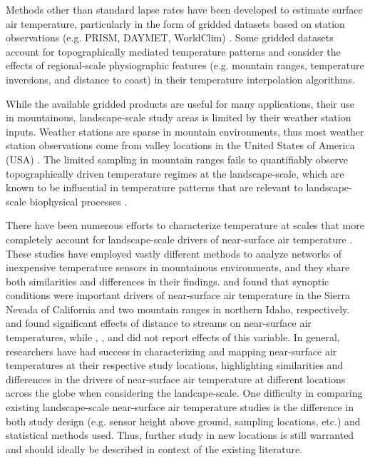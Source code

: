 \documentclass{ametsoc}
\begin{document}
Methods other than standard lapse rates have been developed to estimate surface
air temperature,  particularly in the form of gridded datasets based on station
observations  (e.g. PRISM, DAYMET, WorldClim)
\citep{Daly2008,Thornton1997,Hijmans2005}.   Some gridded datasets account for
topographically  mediated temperature patterns and consider the effects of
regional-scale  physiographic features (e.g. mountain ranges, temperature
inversions, and  distance to coast) in their temperature interpolation
algorithms.

While the available gridded products are useful for many applications, 
their use in mountainous, landscape-scale study areas is limited by their 
weather station inputs.  Weather stations are sparse in mountain environments, 
thus most weather station observations come from valley locations in the 
United States of America (USA) \citep{Hijmans2005,Myrick2008,Horel2010}.  
The limited sampling in mountain ranges fails to quantifiably observe 
topographically driven temperature regimes at the landscape-scale, which 
are known to be influential in temperature patterns that are relevant to 
landscape-scale biophysical processes 
\citep{Lundquist2007,Barry2008,Geiger2009,Crimmins2011,Ashcroft2012}.

There have been numerous efforts to characterize temperature at scales that
more completely account for landscape-scale drivers of near-surface air
temperature
\citep{Lundquist2007,Holden2011,Lookingbill2003,Ashcroft2011,Fridley2009}.
These studies have employed vastly different methods to analyze networks of
inexpensive   temperature sensors in mountainous environments, and they share
both similarities   and differences in their findings.  \citet{Lundquist2007}
and \citet{Holden2011} found that synoptic conditions were important drivers
of near-surface air temperature in the Sierra Nevada of California and two
mountain ranges in northern Idaho, respectively.  \citet{Lookingbill2003} and
\citet{Fridley2009} found significant effects of distance to streams on near-surface
 air temperatures, while \citet{Holden2011}, \citet{Ashcroft2011}, and
\citet{Lundquist2007} did not report effects of this variable.  In general,
researchers have had success in characterizing and mapping near-surface air
temperatures at their respective study locations, highlighting similarities and
differences in the drivers of near-surface air temperature at different
locations across the globe when considering the landcape-scale.  One difficulty in 
comparing existing landscape-scale
near-surface air temperature studies is the difference in both study
design (e.g. sensor height above ground, sampling locations, etc.) and
statistical methods used.  Thus, further study in new locations is still
warranted and should ideally be described in context of the existing literature.
\end{document}
